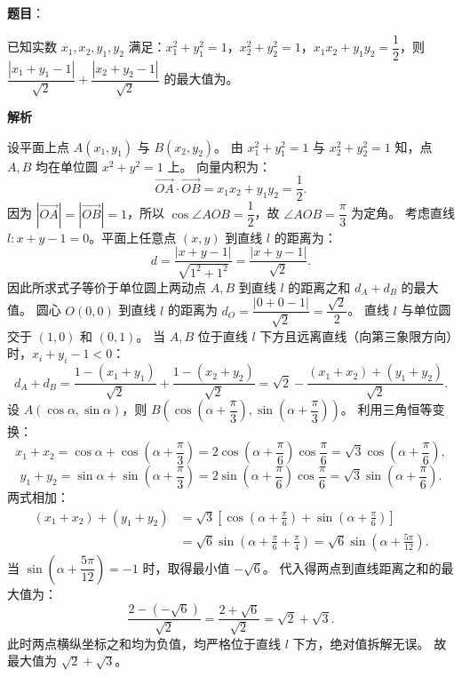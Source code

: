 \begin{answer}

\textbf{题目}：

已知实数 $x_1, x_2, y_1, y_2$ 满足：$x_1^2 + y_1^2 = 1$，$x_2^2 + y_2^2 = 1$，$x_1 x_2 + y_1 y_2 = \dfrac{1}{2}$，则 $\dfrac{|x_1 + y_1 - 1|}{\sqrt{2}} + \dfrac{|x_2 + y_2 - 1|}{\sqrt{2}}$ 的最大值为\gkblank{}。

\textbf{解析}

设平面上点 $A(x_1, y_1)$ 与 $B(x_2, y_2)$。
由 $x_1^2 + y_1^2 = 1$ 与 $x_2^2 + y_2^2 = 1$ 知，点 $A, B$ 均在单位圆 $x^2 + y^2 = 1$ 上。
向量内积为：
\nopagebreak[4]
\[\vec{OA} \cdot \vec{OB} = x_1 x_2 + y_1 y_2 = \frac{1}{2}.\]
因为 $|\vec{OA}| = |\vec{OB}| = 1$，所以 $\cos\angle AOB = \dfrac{1}{2}$，故 $\angle AOB = \dfrac{\pi}{3}$ 为定角。
考虑直线 $l: x + y - 1 = 0$。平面上任意点 $(x, y)$ 到直线 $l$ 的距离为：
\nopagebreak[4]
\[d = \frac{|x + y - 1|}{\sqrt{1^2 + 1^2}} = \frac{|x + y - 1|}{\sqrt{2}}.\]
因此所求式子等价于单位圆上两动点 $A, B$ 到直线 $l$ 的距离之和 $d_A + d_B$ 的最大值。
圆心 $O(0, 0)$ 到直线 $l$ 的距离为 $d_O = \dfrac{|0 + 0 - 1|}{\sqrt{2}} = \dfrac{\sqrt{2}}{2}$。
直线 $l$ 与单位圆交于 $(1, 0)$ 和 $(0, 1)$。
当 $A, B$ 位于直线 $l$ 下方且远离直线（向第三象限方向）时，$x_i + y_i - 1 < 0$：
\nopagebreak[4]
\[d_A + d_B = \frac{1 - (x_1 + y_1)}{\sqrt{2}} + \frac{1 - (x_2 + y_2)}{\sqrt{2}} = \sqrt{2} - \frac{(x_1 + x_2) + (y_1 + y_2)}{\sqrt{2}}.\]
设 $A\left(\cos\alpha, \sin\alpha\right)$，则 $B\left(\cos\left(\alpha + \dfrac{\pi}{3}\right), \sin\left(\alpha + \dfrac{\pi}{3}\right)\right)$。
利用三角恒等变换：
\nopagebreak[4]
\[x_1 + x_2 = \cos\alpha + \cos\left(\alpha + \frac{\pi}{3}\right) = 2\cos\left(\alpha + \frac{\pi}{6}\right)\cos\frac{\pi}{6} = \sqrt{3}\cos\left(\alpha + \frac{\pi}{6}\right),\]
\nopagebreak[4]
\[y_1 + y_2 = \sin\alpha + \sin\left(\alpha + \frac{\pi}{3}\right) = 2\sin\left(\alpha + \frac{\pi}{6}\right)\cos\frac{\pi}{6} = \sqrt{3}\sin\left(\alpha + \frac{\pi}{6}\right).\]
两式相加：
\nopagebreak[4]
\[\begin{aligned}
(x_1 + x_2) + (y_1 + y_2) &= \sqrt{3}\left[\cos\left(\alpha + \frac{\pi}{6}\right) + \sin\left(\alpha + \frac{\pi}{6}\right)\right] \\
&= \sqrt{6}\sin\left(\alpha + \frac{\pi}{6} + \frac{\pi}{4}\right) = \sqrt{6}\sin\left(\alpha + \frac{5\pi}{12}\right).
\end{aligned}\]
当 $\sin\left(\alpha + \dfrac{5\pi}{12}\right) = -1$ 时，取得最小值 $-\sqrt{6}$。
代入得两点到直线距离之和的最大值为：
\nopagebreak[4]
\[\frac{2 - (-\sqrt{6})}{\sqrt{2}} = \frac{2 + \sqrt{6}}{\sqrt{2}} = \sqrt{2} + \sqrt{3}.\]
此时两点横纵坐标之和均为负值，均严格位于直线 $l$ 下方，绝对值拆解无误。
故最大值为 $\sqrt{2} + \sqrt{3}$。


\par\medskip

\end{answer}

